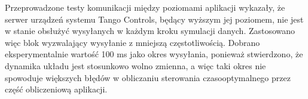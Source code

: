 Przeprowadzone testy komunikacji między poziomami aplikacji wykazały, że serwer urządzeń systemu Tango Controls, będący wyższym jej poziomem, nie jest w stanie obsłużyć wysyłanych w każdym kroku symulacji danych. Zastosowano więc blok wyzwalający wysyłanie z mniejszą częstotliwością. Dobrano eksperymentalnie wartość 100 ms jako okres wysyłania, ponieważ stwierdzono, że dynamika układu jest stosunkowo wolno zmienna, a więc taki okres nie spowoduje większych błędów w obliczaniu sterowania czasooptymalnego przez część obliczeniową aplikacji.
